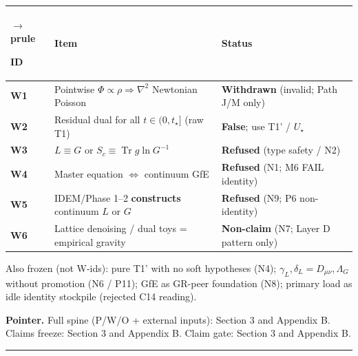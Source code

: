 \documentclass[
  11pt,
]{article}
\newcounter{none} %
\begin{document}
{\def\LTcaptype{none} %
\begin{longtable}[]{@{}
  >{\raggedright\arraybackslash}p{}
  >{\raggedright\arraybackslash}p{}
  >{\raggedright\arraybackslash}p{}@{}}
$\rightarrow$prule\noalign{}
\begin{minipage}[b]{\linewidth}\raggedright
ID
\end{minipage} & \begin{minipage}[b]{\linewidth}\raggedright
Item
\end{minipage} & \begin{minipage}[b]{\linewidth}\raggedright
Status
\end{minipage} \\
\midrule\noalign{}
\endhead
\bottomrule\noalign{}
\endlastfoot
\textbf{W1} & Pointwise \(\Phi\propto\rho\Rightarrow\nabla^2\) Newtonian Poisson & \textbf{Withdrawn} (invalid; Path J/M only) \\
\textbf{W2} & Residual dual for all \(t\in(0,t_\star]\) (raw T1) & \textbf{False}; use T1' / \(U_\star\) \\
\textbf{W3} & \(L\equiv G\) or \(S_c\equiv\operatorname{Tr} g\ln G^{-1}\) & \textbf{Refused} (type safety / N2) \\
\textbf{W4} & Master equation \(\Leftrightarrow\) continuum GfE & \textbf{Refused} (N1; M6 FAIL identity) \\
\textbf{W5} & IDEM/Phase 1--2 \textbf{constructs} continuum \(L\) or \(G\) & \textbf{Refused} (N9; P6 non-identity) \\
\textbf{W6} & Lattice denoising / dual toys = empirical gravity & \textbf{Non-claim} (N7; Layer D pattern only) \\
\end{longtable}
}

Also frozen (not W-ids): pure T1' with no soft hypotheses (N4); \(\gamma_L,\delta_L=D_{\mu\nu},\Lambda_G\) without promotion (N6 / P11); GfE as GR-peer foundation (N8); primary load as idle identity stockpile (rejected C14 reading).

\textbf{Pointer.} Full spine (P/W/O + external inputs): Section 3 and Appendix B. Claims freeze: Section 3 and Appendix B. Claim gate: Section 3 and Appendix B.

\begin{center}\rule{0.5\linewidth}{0.5pt}\end{center}
\end{document}
